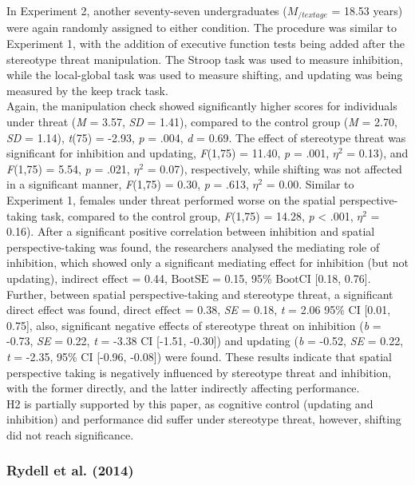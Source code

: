 \documentclass[
  stu,floatsintext]{apa7}
\begin{document}
In Experiment 2, another seventy-seven undergraduates (\(M_{/text{age}}\) = 18.53 years) were again randomly assigned to either condition.
The procedure was similar to Experiment 1, with the addition of executive function tests being added after the stereotype threat manipulation.
The Stroop task was used to measure inhibition, while the local-global task was used to measure shifting, and updating was being measured by the keep track task.\\
Again, the manipulation check showed significantly higher scores for individuals under threat (\emph{M} = 3.57, \emph{SD} = 1.41), compared to the control group (\emph{M} = 2.70, \emph{SD} = 1.14), \emph{t}(75) = -2.93, \emph{p} = .004, \emph{d} = 0.69.
The effect of stereotype threat was significant for inhibition and updating, \emph{F}(1,75) = 11.40, \emph{p} = .001, \(\eta^{2}\) = 0.13), and \emph{F}(1,75) = 5.54, \emph{p} = .021, \(\eta^{2}\) = 0.07), respectively, while shifting was not affected in a significant manner, \emph{F}(1,75) = 0.30, \emph{p} = .613, \(\eta^2\) = 0.00.
Similar to Experiment 1, females under threat performed worse on the spatial perspective-taking task, compared to the control group, \emph{F}(1,75) = 14.28, \emph{p} \textless{} .001, \(\eta^{2}\) = 0.16).
After a significant positive correlation between inhibition and spatial perspective-taking was found, the researchers analysed the mediating role of inhibition, which showed only a significant mediating effect for inhibition (but not updating), \(\text{indirect effect}\) = 0.44, \(\text{BootSE}\) = 0.15, 95\% \(\text{BootCI}\) {[}0.18, 0.76{]}.
Further, between spatial perspective-taking and stereotype threat, a significant direct effect was found, \(\text{direct effect}\) = 0.38, \emph{SE} = 0.18, \emph{t} = 2.06 95\% \(\text{CI}\) {[}0.01, 0.75{]}, also, significant negative effects of stereotype threat on inhibition (\emph{b} = -0.73, \emph{SE} = 0.22, \emph{t} = -3.38 CI {[}-1.51, -0.30{]}) and updating (\emph{b} = -0.52, \emph{SE} = 0.22, \emph{t} = -2.35, 95\% CI {[}-0.96, -0.08{]}) were found.
These results indicate that spatial perspective taking is negatively influenced by stereotype threat and inhibition, with the former directly, and the latter indirectly affecting performance.\\
H2 is partially supported by this paper, as cognitive control (updating and inhibition) and performance did suffer under stereotype threat, however, shifting did not reach significance.

\subsubsection{Rydell et al. (2014)}\label{rydellstereotypethreatexecutive2014}
\end{document}
